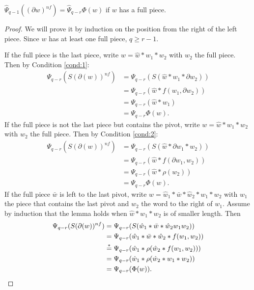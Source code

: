 \begin{lemma}
	$\hat{\Psi}_{q-1}((\partial w)^{nf}) = \hat{\Psi}_{q-r}\Phi(w)$ if $w$ has a full piece.
\end{lemma}

\begin{proof}
	We will prove it by induction on the position from the right of the left piece. Since $w$ has at least one full piece, $q\geq r-1$.

	If the full piece is the last piece, write $w=\hat{w}*w_1*w_2$ with $w_2$ the full piece. Then by Condition \eqref{cond:1}:
	\begin{align*}
		\Psi_{q-r}(S(\partial(w))^{nf}) &= \Psi_{q-r}(S(\hat{w}*w_1*\partial w_2)) \\
		&= \Psi_{q-r}(\hat{w}*f(w_1,\partial w_2)) \\
		&= \Psi_{q-r}(\hat{w}*w_1) \\
		&= \Psi_{q-r}\Phi(w).
	\end{align*}
	If the full piece is not the last piece but contains the pivot, write $w=\hat{w}*w_1*w_2$ with $w_2$ the full piece. Then by Condition \eqref{cond:2}:
	\begin{align*}
		\Psi_{q-r}(S(\partial(w))^{nf}) &= \Psi_{q-r}(S(\hat{w}*\partial w_1* w_2)) \\
		&= \Psi_{q-r}(\hat{w}*f(\partial w_1, w_2)) \\
		&= \Psi_{q-r}(\hat{w}*\rho(w_2)) \\
		&= \Psi_{q-r}\Phi(w).
	\end{align*}
	If the full piece $\bar{w}$ is left to the last pivot, write $w=\hat{w}_1*\bar{w}*\hat{w}_2*w_1*w_2$ with $w_1$ the piece that contains the last pivot and $w_2$ the word to the right of $w_1$. Assume by induction that the lemma holds when $\hat{w}*w_1*w_2$ is of smaller length. Then
	\begin{align*}
		\Psi_{q-r}(S(\partial(w))^{nf}) &= \Psi_{q-r}(S(\hat{w}_1*\bar{w}*\hat{w}_2w_1w_2)) \\
		&= \Psi_{q-r}(\hat{w}_1*\bar{w}*\hat{w}_2*f(w_1,w_2)) \\
		&\overset{*}{=} \Psi_{q-r}(\hat{w}_1*\rho(\hat{w}_2*f(w_1,w_2)))\\
		&= \Psi_{q-r}(\hat{w}_1*\rho(\hat{w}_2*w_1*w_2))\\
		&= \Psi_{q-r}(\Phi(w)). \qedhere
	\end{align*}
\end{proof}

